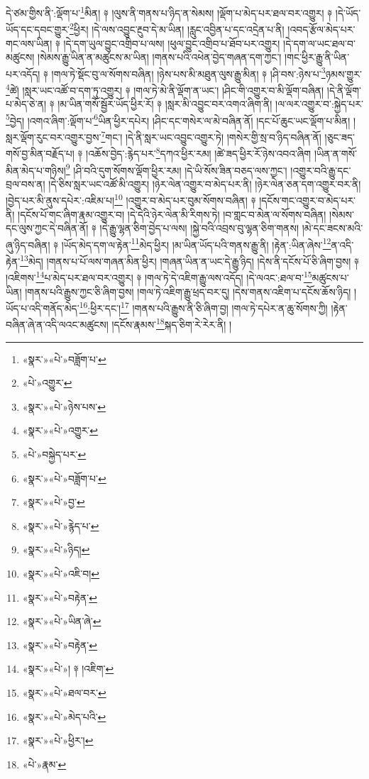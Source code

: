 དེ་ཙམ་གྱིས་ནི་:ལྡོག་པ་\footnote{«སྣར་»«པེ་»བཟློག་པ་}མིན། ༈ །ལུས་ནི་གནས་པ་ཉིད་ན་སེམས། །ལྡོག་པ་མེད་པར་ཐལ་བར་འགྱུར། ༈ །དེ་ཡོད་ཡོད་དང་དབང་གྱུར་\footnote{«པེ་»འགྱུར་}ཕྱིར། །དེ་ལས་འབྱུང་རྔུབ་དེ་མ་ཡིན། །རླུང་འབྱིན་པ་དང་འདྲེན་པ་ནི། །འབད་རྩོལ་མེད་པར་གང་ལས་ཡིན། ༈ །དེ་དག་ཡུལ་བྱུང་འགྲིབ་པ་ལས། །ཕུལ་བྱུང་འགྲིབ་པ་ཐོབ་པར་འགྱུར། །དེ་དག་ལ་ཡང་ཐལ་བ་མཚུངས། །སེམས་རྒྱུ་ཡིན་ན་མཚུངས་མ་ཡིན། །གནས་པའི་འཕེན་བྱེད་གཞན་དག་ཀྱང་། །གང་ཕྱིར་རྒྱུ་ནི་ཡིན་པར་འདོད། ༈ །གལ་ཏེ་སྡོང་བུ་ལ་སོགས་བཞིན། །ཉེས་པས་མི་མཐུན་ལུས་རྒྱུ་མིན། ༈ །ཤི་བས་:ཉེས་པ་\footnote{«སྣར་»«པེ་»ཉེས་པས་}ཉམས་གྱུར་\footnote{«སྣར་»«པེ་»འགྱུར་}ཚེ། །སླར་ཡང་འཚོ་བ་དག་ཏུ་འགྱུར། ༈ །གལ་ཏེ་མེ་ནི་ལྡོག་ན་ཡང་། །ཤིང་གི་འགྱུར་བ་མི་ལྡོག་བཞིན། །དེ་ནི་ལྡོག་པ་མེད་ཅེ་ན། ༈ །མ་ཡིན་གསོ་སྦྱོར་ཡོད་ཕྱིར་རོ། ༈ །སླར་མི་འབྱུང་བར་འགའ་ཞིག་ནི། །ལ་ལར་འགྱུར་བ་:སྐྱེད་པར་\footnote{«པེ་»བསྐྱེད་པར་}བྱེད། །འགའ་ཞིག་:ལྡོག་པ་\footnote{«སྣར་»«པེ་»བཟློག་པ་}ཡིན་ཕྱིར་དཔེར། །ཤིང་དང་གསེར་ལ་མེ་བཞིན་ནོ། །དང་པོ་ཆུང་ཡང་ལྡོག་པ་མིན། །སླར་ལྡོག་རུང་བར་འགྱུར་བྱས་\footnote{«སྣར་»«པེ་»བྱ་}གང་། །དེ་ནི་སླར་ཡང་འབྱུང་འགྱུར་ཏེ། །གསེར་གྱི་སྲ་བ་ཉིད་བཞིན་ནོ། །ཅུང་ཟད་གསོ་བྱ་མིན་བརྗོད་པ། ༈ །འཆོས་བྱེད་:རྙེད་པར་\footnote{«སྣར་»«པེ་»རྙེད་པ་}དཀའ་ཕྱིར་རམ། །ཚེ་ཟད་ཕྱིར་རོ་ཉེས་འབའ་ཞིག །ཡིན་ན་གསོ་མིན་མེད་པ་གཉིས།\footnote{«སྣར་»«པེ་»ཉིད།} །ཤི་བའི་དུག་སོགས་ལྡོག་ཕྱིར་རམ། །དེ་ཡི་སོས་ཟིན་བཅད་ལས་ཀྱང་། །འགྱུར་བའི་རྒྱུ་དང་བྲལ་བས་ན། །དེ་ཅིས་སླར་ཡང་འཚོ་མི་འགྱུར། །ཉེར་ལེན་འགྱུར་བ་མེད་པར་ནི། །ཉེར་ལེན་ཅན་དག་འགྱུར་བར་ནི། །བྱེད་པར་མི་ནུས་དཔེར་:འཇིམ་པ།\footnote{«སྣར་»«པེ་»འཇི་བ།} །འགྱུར་བ་མེད་པར་བུམ་སོགས་བཞིན། ༈ །དངོས་གང་འགྱུར་བ་མེད་པར་ནི། །དངོས་པོ་གང་ཞིག་རྣམ་འགྱུར་བ། །དེ་དེའི་ཉེར་ལེན་མི་རིགས་ཏེ། །བ་གླང་བ་མེན་ལ་སོགས་བཞིན། །སེམས་དང་ལུས་ཀྱང་དེ་བཞིན་ནོ། ༈ །དེ་རྒྱུ་ལྷན་ཅིག་བྱེད་པ་ལས། །སྐྱེ་བའི་འབྲས་བུ་ལྷན་ཅིག་གནས། །མེ་དང་ཟངས་མའི་ཞུ་ཉིད་བཞིན། ༈ །ཡོད་མེད་དག་ལ་རྟེན་\footnote{«སྣར་»«པེ་»བརྟེན་}མེད་ཕྱིར། །མ་ཡིན་ཡོད་པའི་གནས་རྒྱུ་ནི། །རྟེན་:ཡིན་ཞེས་\footnote{«སྣར་»«པེ་»ཡིན་ཞེ་}ན་འདི་རྟེན་\footnote{«སྣར་»«པེ་»བརྟེན་}མེད། །གནས་པ་པོ་ལས་གཞན་མིན་ཕྱིར། །གཞན་ཡིན་ན་ཡང་དེ་རྒྱུ་ཉིད། །དེས་ནི་དངོས་པོ་ཅི་ཞིག་བྱས། ༈ །འཇིགས་\footnote{«སྣར་»«པེ་»། ༈ །འཇིག་}པ་མེད་པར་ཐལ་བར་འགྱུར། ༈ །གལ་ཏེ་དེ་འཇིག་རྒྱུ་ལས་འདོད། །དེ་ལའང་:ཐལ་བ་\footnote{«སྣར་»«པེ་»ཐལ་བར་}མཚུངས་པ་ཡིན། །གནས་པའི་རྒྱུས་ཀྱང་ཅི་ཞིག་བྱས། །གལ་ཏེ་འཇིག་རྒྱུ་ཕྲད་བར་དུ། །དེས་གནས་འཇིག་པ་དངོས་ཆོས་ཉིད། །ཡོད་པ་འདི་གནོད་མེད་\footnote{«སྣར་»«པེ་»མེད་པའི་}:ཕྱིར་དང་།\footnote{«སྣར་»«པེ་»ཕྱིར་།} །གནས་པའི་རྒྱུས་ནི་ཅི་ཞིག་བྱ། །གལ་ཏེ་དཔེར་ན་ཆུ་སོགས་ཀྱི། །རྟེན་བཞིན་ཞེ་ན་འདི་ལའང་མཚུངས། །དངོས་རྣམས་\footnote{«པེ་»རྣམ་}སྐད་ཅིག་རེ་རེར་ནི། །
